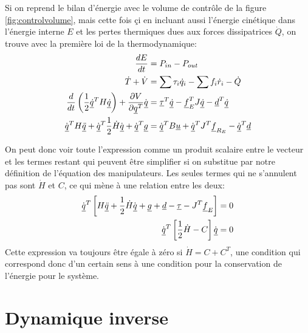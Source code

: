 Si on reprend le bilan d'énergie avec le volume de contrôle de la figure \ref{fig:controlvolume}, mais cette fois çi en incluant aussi l'énergie cinétique dans l'énergie interne $E$ et les pertes thermiques dues aux forces dissipatrices $\dot{Q}$, on trouve avec la première loi de la thermodynamique:
\begin{align}
\frac{dE}{dt}     &= P_{in} - P_{out} \\
\dot{T} + \dot{V}  &= \sum \tau_i \dot{q}_i  - \sum f_i \dot{r}_i - \dot{Q} \\
\frac{d}{dt}\left( \frac{1}{2} \underline{\dot{q}}^T H \underline{\dot{q}} \right) + \frac{\partial V}{\partial \underline{q}^T} \dot{\underline{q}} &= \underline{\tau}^T \underline{\dot{q}}  - \underline{f}_E^T J \underline{\dot{q}} - \underline{d}^T \underline{\dot{q}} \\
\dot{\underline{q}}^T H \underline{\ddot{q}} + \dot{\underline{q}}^T \frac{1}{2}\dot{H}\dot{\underline{q}} + \dot{\underline{q}}^T \underline{g} &=  \dot{\underline{q}}^T B\underline{u} + \dot{\underline{q}}^T J^T \underline{f}_{R_E}  - \dot{\underline{q}}^T \underline{d}
\end{align}

On peut donc voir toute l'expression comme un produit scalaire entre le vecteur et les termes restant qui peuvent être simplifier si on substitue par notre définition de l'équation des manipulateurs. Les seules termes qui ne s'annulent pas sont $\dot{H}$ et $C$, ce qui mène à une relation entre les deux:
\begin{align}
\dot{\underline{q}}^T \left[ H \underline{\ddot{q}} + \frac{1}{2}\dot{H}\dot{\underline{q}} + \underline{g} + \underline{d} - \underline{\tau} - J^T \underline{f}_E  \right] &= 0 \\
\dot{\underline{q}}^T \left[ \frac{1}{2}\dot{H} - C \right] \dot{\underline{q}} &= 0
\end{align}
Cette expression va toujours être égale à zéro si $\dot{H} = C + C^T$, une condition qui correspond donc d'un certain sens à une condition pour la conservation de l'énergie pour le système.


\section{Dynamique inverse}
\label{sec:inversedynamic}


